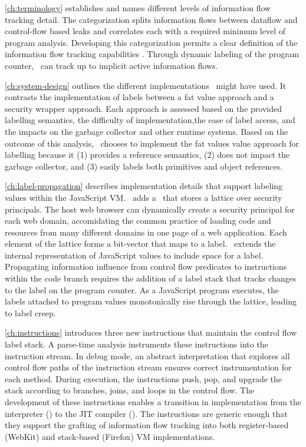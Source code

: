 \autoref{ch:terminology} establishes and names different levels of information flow tracking detail.
The categorization splits information flows between dataflow and control-flow based leaks and correlates each with a required minimum level of program analysis.
Developing this categorization permits a clear definition of the information flow tracking capabilities \FlowCore.
Through dynamic labeling of the program counter, \FlowCore\ can track up to implicit active information flows.

\autoref{ch:system-design} outlines the different implementations \FlowCore\ might have used.
It contrasts the implementation of labels between a fat value approach and a security wrapper approach.
Each approach is assessed based on the provided labelling semantics, the difficulty of implementation,the ease of label access, and the impacts on the garbage collector and other runtime systems.
Based on the outcome of this analysis, \FlowCore\ chooses to implement the fat values value approach for labelling because it (1) provides a reference semantics, (2) does not impact the garbage collector, and (3) easily labels both primitives and object references.

\autoref{ch:label-propagation} describes implementation details that support labeling values within the JavaScript VM.
\FlowCore\ adds a \FlowLabelRegistry\ that stores a lattice over security principals.
The host web browser can dynamically create a security principal for each web domain, accomidating the common practice of loading code and resources from many different domains in one page of a web application.
Each element of the lattice forms a bit-vector that maps to a label.
\FlowCore\ extends the internal representation of JavaScript values to include space for a label.
Propagating information influence from control flow predicates to instructions within the code branch requires the addition of a label stack that tracks changes to the label on the program counter.
As a JavaScript program executes, the labels attached to program values monotonically rise through the lattice, leading to label creep.

\autoref{ch:instructions} introduces three new instructions that maintain the control flow label stack.
A parse-time analysis instruments these instructions into the instruction stream.
In debug mode, an abstract interpretation that explores all control flow paths of the instruction stream ensures correct instrumentation for each method.
During execution, the instructions push, pop, and upgrade the stack according to branches, joins, and loops in the control flow.
The development of these instructions enables a transition in implementation from the interpreter (\FlowCore) to the JIT compiler (\JitFlow).
The instructions are generic enough that they support the grafting of information flow tracking into both register-based (WebKit) and stack-based (Firefox) VM implementations.

